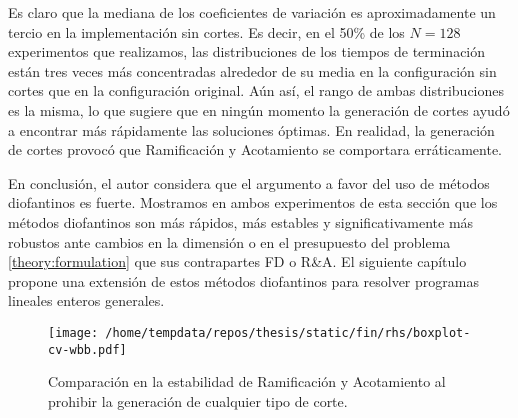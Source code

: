 Es claro que la mediana de los coeficientes de variación es aproximadamente un tercio en la
implementación sin cortes. Es decir, en el 50\% de los $N = 128$ experimentos que realizamos, las
distribuciones de los tiempos de terminación están tres veces más concentradas alrededor de su media
en la configuración sin cortes que en la configuración original. Aún así, el rango de ambas
distribuciones es la misma, lo que sugiere que en ningún momento la generación de cortes ayudó a
encontrar más rápidamente las soluciones óptimas. En realidad, la generación de cortes provocó que
Ramificación y Acotamiento se comportara erráticamente.

En conclusión, el autor considera que el argumento a favor del uso de métodos diofantinos es fuerte.
Mostramos en ambos experimentos de esta sección que los métodos diofantinos son más rápidos, más
estables y significativamente más robustos ante cambios en la dimensión o en el presupuesto del
problema \eqref{theory:formulation} que sus contrapartes FD o R\&A. El siguiente capítulo propone
una extensión de estos métodos diofantinos para resolver programas lineales enteros generales.

\begin{figure}[hbtp]
	\centering
	\texttt{[image: /home/tempdata/repos/thesis/static/fin/rhs/boxplot-cv-wbb.pdf]}
	\caption{Comparación en la estabilidad de Ramificación y Acotamiento al prohibir la generación
		de cualquier tipo de corte.}
	\label{fig:exp:fin:rhs:cv-wbb}
\end{figure}
